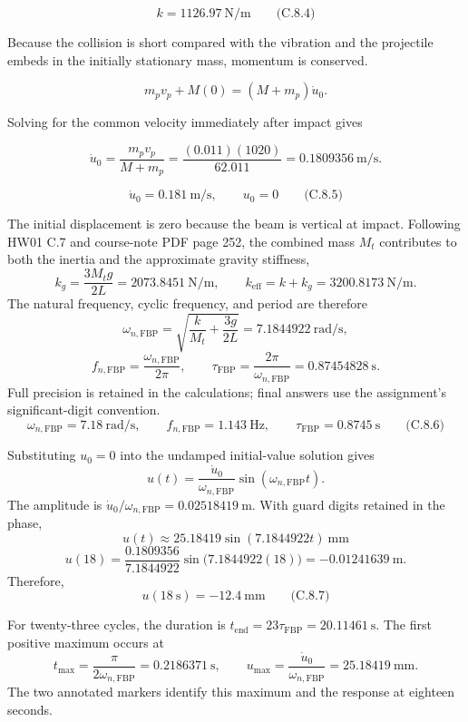 \[
\boxed{k=1126.97\ \mathrm{N/m}}
\qquad\text{(C.8.4)}
\]

Because the collision is short compared with the vibration and the projectile embeds in the initially stationary mass, momentum is conserved.

\[
m_pv_p+M(0)=(M+m_p)\dot u_0.
\]

Solving for the common velocity immediately after impact gives

\[
\dot u_0=\frac{m_pv_p}{M+m_p}
=\frac{(0.011)(1020)}{62.011}
=0.1809356\ \mathrm{m/s}.
\]

\[
\boxed{\dot u_0=0.181\ \mathrm{m/s},\qquad u_0=0}
\qquad\text{(C.8.5)}
\]

The initial displacement is zero because the beam is vertical at impact. Following HW01 C.7 and course-note PDF page 252, the combined mass \(M_t\) contributes to both the inertia and the approximate gravity stiffness,
\[
k_g=\frac{3M_tg}{2L}=2073.8451\ \mathrm{N/m},
\qquad k_{\mathrm{eff}}=k+k_g=3200.8173\ \mathrm{N/m}.
\]
The natural frequency, cyclic frequency, and period are therefore
\[
\omega_{n,\mathrm{FBP}}=\sqrt{\frac{k}{M_t}+\frac{3g}{2L}}
=7.1844922\ \mathrm{rad/s},
\]
\[
f_{n,\mathrm{FBP}}=\frac{\omega_{n,\mathrm{FBP}}}{2\pi},
\qquad \tau_{\mathrm{FBP}}=\frac{2\pi}{\omega_{n,\mathrm{FBP}}}
=0.87454828\ \mathrm{s}.
\]
Full precision is retained in the calculations; final answers use the assignment's significant-digit convention.
\[
\boxed{\omega_{n,\mathrm{FBP}}=7.18\ \mathrm{rad/s},\qquad
f_{n,\mathrm{FBP}}=1.143\ \mathrm{Hz},\qquad
\tau_{\mathrm{FBP}}=0.8745\ \mathrm{s}}
\qquad\text{(C.8.6)}
\]

Substituting \(u_0=0\) into the undamped initial-value solution gives
\[
u(t)=\frac{\dot u_0}{\omega_{n,\mathrm{FBP}}}
\sin(\omega_{n,\mathrm{FBP}}t).
\]
The amplitude is \(\dot u_0/\omega_{n,\mathrm{FBP}}=0.02518419\ \mathrm{m}\). With guard digits retained in the phase,
\[
\boxed{u(t)\approx25.18419\sin(7.1844922t)\ \mathrm{mm}}
\]
\[
u(18)=\frac{0.1809356}{7.1844922}
\sin\bigl(7.1844922(18)\bigr)
=-0.01241639\ \mathrm{m}.
\]
Therefore,
\[
\boxed{u(18\ \mathrm{s})=-12.4\ \mathrm{mm}}
\qquad\text{(C.8.7)}
\]

For twenty-three cycles, the duration is \(t_{\mathrm{end}}=23\tau_{\mathrm{FBP}}=20.11461\ \mathrm{s}\). The first positive maximum occurs at
\[
t_{\max}=\frac{\pi}{2\omega_{n,\mathrm{FBP}}}=0.2186371\ \mathrm{s},
\qquad u_{\max}=\frac{\dot u_0}{\omega_{n,\mathrm{FBP}}}
=25.18419\ \mathrm{mm}.
\]
The two annotated markers identify this maximum and the response at eighteen seconds.

